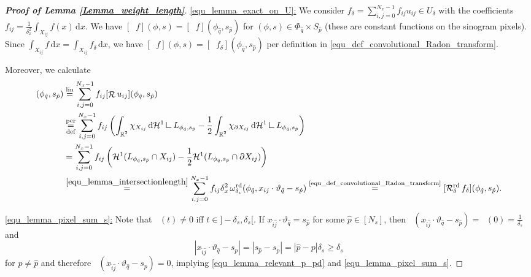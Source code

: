 \documentclass[10pt,a4paper]{amsart}
\DeclareMathOperator{\PixelWeight}{\omega^\mathrm{pd}_{\delta_\mathit{s}}}
\DeclareMathOperator{\RR}{\mathbb{R}}
\DeclareMathOperator{\Radon}{\mathcal{R}}
\DeclareMathOperator{\RayRadon}{\mathcal{R}^\mathrm{rd}_{\delta}}
\DeclareMathOperator{\RayWeight}{\omega^\mathrm{rd}_{\delta_\mathit{x}}}
\newcommand{\dd}[1]{\,\mathrm{d}{#1}}
\newcommand{\mres}{\mathbin{\vrule height 1.6ex depth 0pt width
0.13ex\vrule height 0.13ex depth 0pt width 1.3ex}}
\newcommand{\sumx}{\sum_{i,j=0}^{N_x-1}}
\begin{document}
\begin{proof}[\textbf{Proof of Lemma \ref{Lemma_weight_length}}]
\underline{\eqref{equ_lemma_exact_on_U}:}  We consider $f_\delta=\sumx f_{ij} u_{ij}\in U_\delta$ with the coefficients $f_{ij}= \frac{1}{\delta_x^2}\int_{X_{ij}}f(x) \dd x$. 
We have $[\RayRadon f] (\phi,s)=[\RayRadon f] (\phi_{\hat q},s_{\hat p})$ for $(\phi,s)\in \Phi_{\hat q}\times S_{\hat p}$ (these  are constant functions on the sinogram pixels). Since $\int_{X_{ij}}f \dd x = \int_{X_{ij}}f_\delta \dd x$, we have  $[\RayRadon f] (\phi,s)=[\RayRadon f_\delta] (\phi_{\hat q},s_{\hat p})$ per definition in \eqref{equ_def_convolutional_Radon_transform}.

Moreover, we calculate
\begin{align*}
[\Radon f_\delta](\phi_{\hat q},s_{\hat p}) & \overset{\text{lin}}{=} \sumx f_{ij} [\Radon u_{ij}](\phi_{\hat q},s_{\hat p})
\\ 
&\underset{\text{def}}{\overset{\text{per}}{=}} \sumx f_{ij} \left ( \int_{\RR^2} \chi_{X_{ij}} \dd {\mathcal{H}^1 \mres L_{\phi_{\hat q},s_{\hat p}}}- \frac 12 \int_{\RR^2} \chi_{\partial X_{ij}} \dd {\mathcal{H}^1 \mres {L_{\phi_{\hat q},s_{\hat p}}}} \right)
\\
&
=\sumx f_{ij}\left ( \mathcal{H}^1(L_{\phi_{\hat q},s_{\hat p}} \cap X_{ij})- \frac{1}{2}\mathcal{H}^1(L_{\phi_{\hat q},s_{\hat p}} \cap \partial X_{ij}) \right)
\\
& \overset{\eqref{equ_lemma_intersectionlength}}{=} \sumx f_{ij} \delta_x^2\RayWeight (\phi_{\hat q},x_{ij}\cdot\vartheta_{\hat q} -s_{\hat p})
 \underset{}{\overset{\text{\eqref{equ_def_convolutional_Radon_transform}}}{=}} [\RayRadon f_\delta](\phi_{\hat q},s_{\hat p}) .
\end{align*}


\underline{ \eqref{equ_lemma_pixel_sum_s}:} Note that $ \PixelWeight(t)\neq 0$ iff  $t\in{]-\delta_s,\delta_s[}$.
If $x_{\hat i \hat j}\cdot\vartheta_{\hat q}=s_{\hat p}$ for some $\hat p \in [N_s]$, then $\PixelWeight(x_{\hat i \hat j}\cdot \vartheta_{\hat q}-s_{\hat p})=\PixelWeight(0)=\frac{1}{\delta_s}$ and 
\begin{equation}
|x_{\hat i \hat j}\cdot\vartheta_{\hat q}-s_{p}|=|s_{\hat p}-s_p| = |\hat p- p|\delta_s\geq \delta_s
\end{equation}
 for $p\neq \hat p$ and therefore $\PixelWeight(x_{\hat i \hat j}\cdot \vartheta_{\hat q}-s_p)=0$, implying \eqref{equ_lemma_relevant_p_pd} and \eqref{equ_lemma_pixel_sum_s}.


\end{proof}
\end{document}
